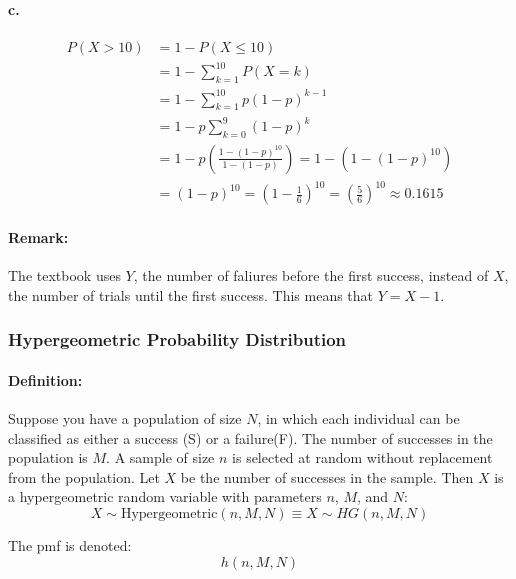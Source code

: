 \paragraph*{c.}
\begin{align*}
    P(X>10) &= 1 - P(X \leq 10) \\
    &= 1 - \sum_{k=1}^{10} P(X=k) \\
    &= 1 - \sum_{k=1}^{10} p(1-p)^{k-1} \\
    &= 1 - p \sum_{k=0}^{9} (1-p)^k \\
    &= 1 - p \left(\frac{1-(1-p)^{10}}{1-(1-p)}\right) = 1 - (1-(1-p)^{10}) \\
    &= (1-p)^{10} = \left(1-\frac{1}{6}\right)^{10} = \left(\frac{5}{6}\right)^{10} \approx 0.1615
\end{align*}

\paragraph*{Remark:}
The textbook uses $Y$, the number of faliures before the first success, instead of $X$, the number of trials until the first success.
This means that $Y = X-1$.

\subsubsection*{Hypergeometric Probability Distribution}

\paragraph*{Definition:}
Suppose you have a population of size $N$, in which each individual can be classified as either a success (S) or a failure(F).
The number of successes in the population is $M$. A sample of size $n$ is selected at random without replacement from the population.
Let $X$ be the number of successes in the sample. Then $X$ is a hypergeometric random variable with parameters $n$, $M$, and $N$:\\
\[
    X \sim \text{Hypergeometric}(n, M, N) \equiv X \sim HG(n, M, N)
\]

The pmf is denoted:
\[
    h(n,M,N)
\]

